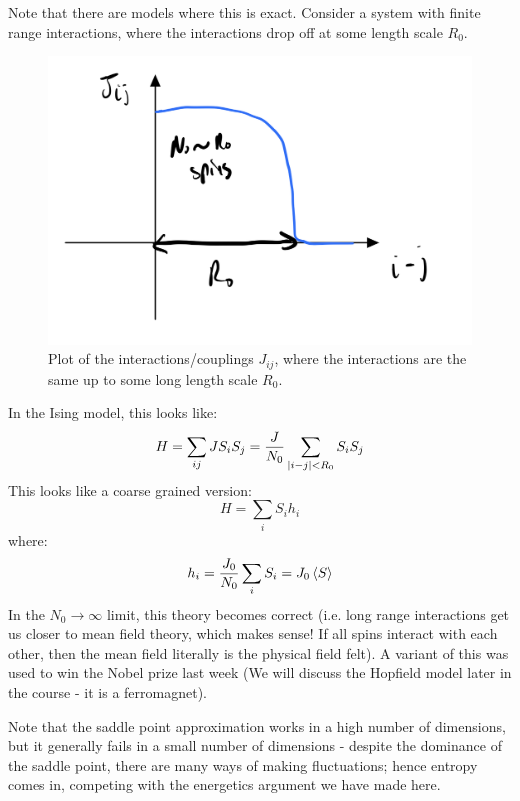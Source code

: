 Note that there are models where this is exact. Consider a system with finite range interactions, where the interactions drop off at some length scale $R_0$. 

\begin{figure}[htbp]
    \centering
    \includegraphics[scale=0.5]{Lectures/Figures/finite_range_interactions.png}
    \caption{Plot of the interactions/couplings $J_{ij}$, where the interactions are the same up to some long length scale $R_0$.}
    \label{fig:finite_range_interactions}
\end{figure}

In the Ising model, this looks like:
\begin{equation}
    H = \sum_{ij}JS_iS_j = \frac{J}{N_0}\sum_{\lvert i-j \rvert < R_0}S_iS_j
\end{equation}
This looks like a coarse grained version:
\begin{equation}
    H = \sum_i S_i h_i
\end{equation}
where:
\begin{equation}
    h_i = \frac{J_0}{N_0}\sum_i S_i = J_0\left< S \right>
\end{equation}
In the $N_0 \to \infty$ limit, this theory becomes correct (i.e. long range interactions get us closer to mean field theory, which makes sense! If all spins interact with each other, then the mean field literally is the physical field felt). A variant of this was used to win the Nobel prize last week (We will discuss the Hopfield model later in the course - it is a ferromagnet).

Note that the saddle point approximation works in a high number of dimensions, but it generally fails in a small number of dimensions - despite the dominance of the saddle point, there are many ways of making fluctuations; hence entropy comes in, competing with the energetics argument we have made here.

